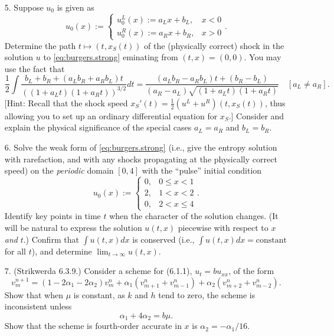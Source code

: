 \documentclass{article}
\begin{document}
\begin{itemize}
\item[5.] Suppose $u_0$ is given as
\begin{equation*}
u_0(x) := \begin{cases} u^L_0(x) := a_L x + b_L, & x < 0 \\ u^R_0(x) := a_R x + b_R, & x > 0 \end{cases}.
\end{equation*}
Determine the path $t \mapsto \left( t, x_S(t) \right)$ of the (physically correct) shock in the solution $u$ to \eqref{eq:burgers.strong} eminating from $(t,x) = (0,0)$. You may use the fact that
\begin{equation*}
\frac{1}{2} \int \frac{b_L + b_R + \left( a_L b_R + a_R b_L \right) t}{\left( \left( 1 + a_L t \right) \left( 1 + a_R t \right) \right)^{3/2}} dt = \frac{\left( a_L b_R - a_R b_L \right) t + \left( b_R - b_L \right)}{\left( a_R - a_L \right) \sqrt{\left( 1 + a_L t \right) \left( 1 + a_R t \right)}} \quad \left[ a_L \neq a_R \right].
\end{equation*}
[Hint: Recall that the shock speed $x_S'(t) = \frac{1}{2} \left( u^L + u^R \right) \left( t, x_S(t) \right)$, thus allowing you to set up an ordinary differential equation for $x_S$.] Consider and explain the physical significance of the special cases $a_L = a_R$ and $b_L = b_R$.

\item[6.] Solve the weak form of \eqref{eq:burgers.strong} (i.e., give the entropy solution with rarefaction, and with any shocks propagating at the physically correct speed) on the \emph{periodic} domain $[0,4]$ with the ``pulse'' initial condition
\begin{equation}\label{eq:pulse}
u_0(x) := \begin{cases} 0, & 0 \leq x < 1 \\ 2, & 1 < x < 2 \\ 0, & 2 < x \leq 4 \end{cases}.
\end{equation}
Identify key points in time $t$ when the character of the solution changes. (It will be natural to express the solution $u(t,x)$ piecewise with respect to $x$ \emph{and} $t$.) Confirm that $\int u(t,x) dx$ is conserved (i.e., $\int u(t,x) dx = \text{constant}$ for all $t$), and determine $\lim_{t \to \infty} u(t,x)$.

\item[7.] (Strikwerda 6.3.9.) Consider a scheme for (6.1.1), $u_t = b u_{xx}$, of the form
\begin{equation*}
v^{n+1}_m = \left( 1 - 2 \alpha_1 - 2 \alpha_2 \right) v^n_m + \alpha_1 \left( v^n_{m+1} + v^n_{m-1} \right) + \alpha_2 \left( v^n_{m+2} + v^n_{m-2} \right).
\end{equation*}
Show that when $\mu$ is constant, as $k$ and $h$ tend to zero, the scheme is inconsistent unless
\begin{equation*}
\alpha_1 + 4 \alpha_2 = b \mu.
\end{equation*}
Show that the scheme is fourth-order accurate in $x$ is $\alpha_2 = -\alpha_1 / 16$.

\end{itemize}
\end{document}
